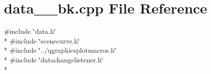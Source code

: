 \section{data\+\_\+\+\_\+bk.\+cpp File Reference}
\label{bk3_2curve_2data____bk_8cpp}
{\ttfamily \#include \char`\"{}data.\+h\char`\"{}}\\*
{\ttfamily \#include \char`\"{}scenecurve.\+h\char`\"{}}\\*
{\ttfamily \#include \char`\"{}../qgraphicsplotmacros.\+h\char`\"{}}\\*
{\ttfamily \#include \char`\"{}datachangelistener.\+h\char`\"{}}\\*
